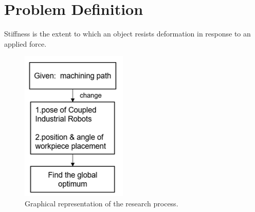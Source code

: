 %

\section{Problem Definition} \label{sec:Introduction:Problem Definition}

\begin{definition}[Stiffness]
	Stiffness is the extent to which an object resists deformation in response to an applied force.
\end{definition}

\begin{figure}[h!]
	\centering
	\includegraphics[width=\textwidth]{03_images/process.png}
	\caption{Graphical representation of the research process.}
	\label{fig:Introduction:meme}
\end{figure}





